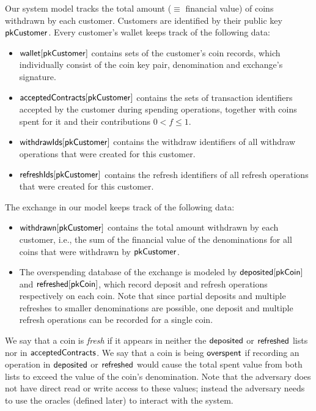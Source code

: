 Our system model tracks the total amount ($\equiv$ financial value) of coins
withdrawn by each customer.
Customers are identified by their public key $\mathsf{pkCustomer}$.  Every
customer's wallet keeps track of the following data:
\begin{itemize}
  \item $\mathsf{wallet}[\mathsf{pkCustomer}]$ contains sets of the customer's coin records,
   which individually consist of the coin key pair, denomination and exchange's signature.
  \item $\mathsf{acceptedContracts}[\mathsf{pkCustomer}]$ contains the sets of
    transaction identifiers accepted by the customer during spending
    operations, together with coins spent for it and their contributions $0 < f
    \le 1$.
  \item $\mathsf{withdrawIds}[\mathsf{pkCustomer}]$ contains the withdraw identifiers of
    all withdraw operations that were created for this customer.
  \item $\mathsf{refreshIds}[\mathsf{pkCustomer}]$ contains the refresh identifiers of
    all refresh operations that were created for this customer.
\end{itemize}


The exchange in our model keeps track of the following data:
\begin{itemize}
  \item $\mathsf{withdrawn}[\mathsf{pkCustomer}]$ contains the total amount withdrawn by
    each customer, i.e., the sum of the financial value of the denominations for
    all coins that were withdrawn by $\mathsf{pkCustomer}$.
  \item The overspending database of the exchange is modeled by
    $\mathsf{deposited}[\mathsf{pkCoin}]$ and $\mathsf{refreshed}[\mathsf{pkCoin}]$, which record
    deposit and refresh operations respectively on each coin.  Note that since
    partial deposits and multiple refreshes to smaller denominations are
    possible, one deposit and multiple refresh operations can be recorded for a
    single coin.
\end{itemize}

We say that a coin is \emph{fresh} if it appears in neither the $\mathsf{deposited}$
or $\mathsf{refreshed}$ lists nor in $\mathsf{acceptedContracts}$.  We say that a coin is
being $\mathsf{overspent}$ if recording an operation in $\mathsf{deposited}$ or
$\mathsf{refreshed}$ would cause the total spent value from both lists to exceed
the value of the coin's denomination.
Note that the adversary does not have direct read or write access to these
values; instead the adversary needs to use the oracles (defined later) to
interact with the system.

